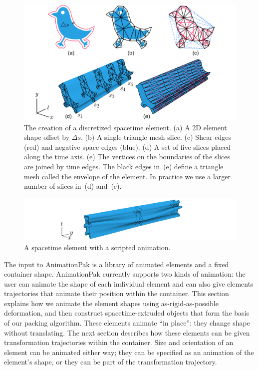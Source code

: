 \begin{figure}
\centering
\includegraphics[width=1.0\textwidth]{figures/animationpak/discretization.pdf} 
\caption[The creation of a discretized spacetime element]
{\label{fig_animationpak_discretization} 
The creation of a discretized spacetime element.  
(a) A 2D element shape offset by $\Delta s$.
(b) A single triangle mesh slice.
(c) Shear edges (red) and negative space edges (blue).
(d) A set of five slices placed along the time axis.
(e) The vertices on the boundaries of the slices are joined by 
	time edges.  The black edges in~(e) define a triangle mesh
	called the envelope of the element.
	In practice we use a larger number of slices in~(d) and~(e).
}
\end{figure}

\begin{figure}
\centering
\includegraphics[width=1.0\textwidth]{figures/animationpak/spacetime_element.pdf} 
\caption[A spacetime element with a scripted animation]
{\label{fig_animationpak_spacetime_element} 
A spacetime element with a scripted animation.}
\end{figure}

The input to AnimationPak is a library of animated elements and a
fixed container shape.  AnimationPak currently supports two kinds
of animation: the user can animate the shape of each individual
element and can also give elements trajectories that animate
their position within the container.  This
section explains how we animate the element shapes using
as-rigid-as-possible deformation, and then construct
spacetime-extruded objects that form the basis of our packing
algorithm.  These elements animate ``in place'': they change
shape without translating. The next section describes how these
elements can be given transformation trajectories within the
container. Size and orientation of an element can be animated
either way; they can be specified as an animation of the element's
shape, or they can be part of the transformation trajectory.



